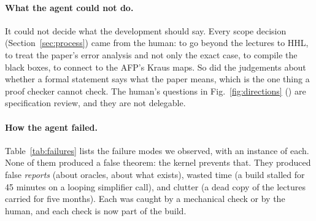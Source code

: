 \paragraph{What the agent could not do.} It could not decide what the development should say. Every
scope decision (Section~\ref{sec:process}) came from the human: to go beyond the lectures to HHL, to
treat the paper's error analysis and not only the exact case, to compile the black boxes, to connect to
the AFP's Kraus maps. So did the judgements about whether a formal statement says what the paper
means, which is the one thing a proof checker cannot check. The human's questions in
Fig.~\ref{fig:directions} () are specification review, and they are not delegable.

\paragraph{How the agent failed.} Table~\ref{tab:failures} lists the failure modes we observed, with an
instance of each. None of them produced a false theorem: the kernel prevents that. They produced
false \emph{reports} (about oracles, about what exists), wasted time (a build stalled for 45 minutes on a
looping simplifier call), and clutter (a dead copy of the lectures carried for five months). Each was
caught by a mechanical check or by the human, and each check is now part of the build.

